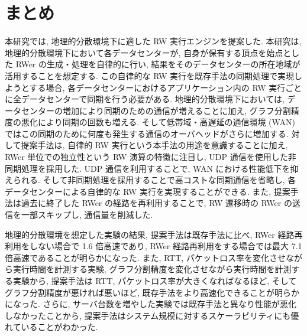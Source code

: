 \section{まとめ}



本研究では, 地理的分散環境下に適した RW 実行エンジンを提案した. 本研究は, 地理的分散環境下において各データセンターが, 自身が保有する頂点を始点とした RWer の生成・処理を自律的に行い, 結果をそのデータセンターの所在地域が活用することを想定する. この自律的な RW 実行を既存手法の同期処理で実現しようとする場合, 各データセンターにおけるアプリケーション内の RW 実行ごとに全データセンターで同期を行う必要がある. 地理的分散環境下においては, データセンターの増加により同期のための通信が増えることに加え, グラフ分割精度の悪化により同期の回数も増える. そして低帯域・高遅延の通信環境 (WAN) ではこの同期のために何度も発生する通信のオーバヘッドがさらに増加する. 対して提案手法は, 自律的 RW 実行という本手法の用途を意識することに加え, RWer 単位での独立性という RW 演算の特徴に注目し, UDP 通信を使用した非同期処理を採用した. UDP 通信を利用することで, WAN における性能低下を抑えられる. そして非同期処理を採用することで高コストな同期通信を省略し, 各データセンターによる自律的な RW 実行を実現することができる. また, 提案手法は過去に終了した RWer の経路を再利用することで, RW 遷移時の RWer の送信を一部スキップし, 通信量を削減した. 

地理的分散環境を想定した実験の結果, 提案手法は既存手法に比べ, RWer 経路再利用をしない場合で 1.6 倍高速であり, RWer 経路再利用をする場合では最大 7.1 倍高速であることが明らかになった. また, RTT, パケットロス率を変化させながら実行時間を計測する実験, グラフ分割精度を変化させながら実行時間を計測する実験から, 提案手法は RTT, パケットロス率が大きくなればなるほど, そしてグラフ分割精度が悪ければ悪いほど, 既存手法をより高速化できることが明らかになった. さらに, サーバ台数を増やした実験では既存手法と異なり性能が悪化しなかったことから, 提案手法はシステム規模に対するスケーラビリティにも優れていることがわかった.

